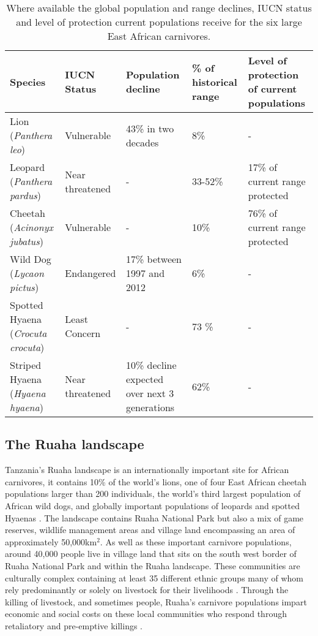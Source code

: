 \begin{table}[h]
	\small
	\begin{center}
		\begin{tabular}{p{2.1cm} p{2.7cm} p{3cm} p{3cm} p{3cm}}
			\hline \hline		
			Species 			& IUCN Status			& Population decline 	& \% of historical range & Level of protection of current populations\\ \hline
			Lion	 (\textit{Panthera leo})				& Vulnerable 		& 43\% in two decades 		& 8\% 		& - \\
			Leopard 	(\textit{Panthera pardus})		& Near threatened 	& -	 						& 33-52\% 	&17\% of current range protected\\
			Cheetah (\textit{Acinonyx jubatus})		& Vulnerable			& - 							& 10\% 		& 76\% of current range protected\\
			Wild Dog (\textit{Lycaon pictus})		& Endangered			& 17\% between 1997 and 2012	& 6\%		& - \\
			Spotted Hyaena (\textit{Crocuta crocuta})& Least Concern		& - 							& 73	\%		& - \\
			Striped Hyaena (\textit{Hyaena hyaena})	& Near threatened	& 10\% decline expected over next 3 generations & 62\% & - \\
			\hline \hline						
		\end{tabular}
		\caption{Where available the global population and range declines, IUCN status and level of protection current populations receive for the six large East African carnivores\cite{Loe2004a,Woodroffe2012a,iucn2007regional,Bauer2016,jacobson2016leopard,AbiSaid2015,Bohm2015,IUCN2016,Ray2005,Durant2015}.}
	\label{table:EACarn}
	\end{center}
\end{table}

\subsection{The Ruaha landscape}
 
Tanzania's Ruaha landscape is an internationally important site for African carnivores, it contains 10\% of the world's lions, one of four East African cheetah populations larger than 200 individuals, the world's third largest population of African wild dogs, and globally important populations of leopards and spotted Hyaenas \cite{Dickman2014d}. The landscape contains Ruaha National Park but also a mix of game reserves, wildlife management areas and village land encompassing an area of approximately 50,000km$^2$. As well as these important carnivore populations, around 40,000 people live in village land that sits on the south west border of Ruaha National Park and within the Ruaha landscape. These communities are culturally complex containing at least 35 different ethnic groups many of whom rely predominantly or solely on livestock for their livelihoods  \cite{Abade2014h}. Through the killing of livestock, and sometimes people, Ruaha's carnivore populations impart economic and social costs on these local communities who respond through retaliatory and pre-emptive killings \cite{Dickman2010b}.\\

